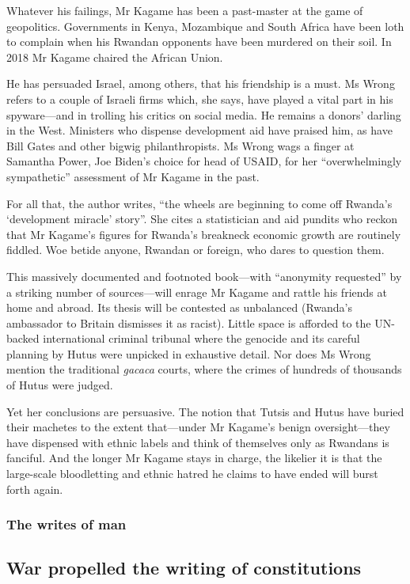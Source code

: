 \documentclass{article}
\begin{document}
Whatever his failings, Mr Kagame has been a past-master at the game of geopolitics. Governments in Kenya, Mozambique and South Africa have been loth to complain when his Rwandan opponents have been murdered on their soil. In 2018 Mr Kagame chaired the African Union. 

He has persuaded Israel, among others, that his friendship is a must. Ms Wrong refers to a couple of Israeli firms which, she says, have played a vital part in his spyware---and in trolling his critics on social media. He remains a donors' darling in the West. Ministers who dispense development aid have praised him, as have Bill Gates and other bigwig philanthropists. Ms Wrong wags a finger at Samantha Power, Joe Biden's choice for head of USAID, for her ``overwhelmingly sympathetic'' assessment of Mr Kagame in the past. 

For all that, the author writes, ``the wheels are beginning to come off Rwanda's `development miracle' story''. She cites a statistician and aid pundits who reckon that Mr Kagame's figures for Rwanda's breakneck economic growth are routinely fiddled. Woe betide anyone, Rwandan or foreign, who dares to question them. 

This massively documented and footnoted book---with ``anonymity requested'' by a striking number of sources---will enrage Mr Kagame and rattle his friends at home and abroad. Its thesis will be contested as unbalanced (Rwanda's ambassador to Britain dismisses it as racist). Little space is afforded to the UN-backed international criminal tribunal where the genocide and its careful planning by Hutus were unpicked in exhaustive detail. Nor does Ms Wrong mention the traditional \emph{gacaca} courts, where the crimes of hundreds of thousands of Hutus were judged. 

Yet her conclusions are persuasive. The notion that Tutsis and Hutus have buried their machetes to the extent that---under Mr Kagame's benign oversight---they have dispensed with ethnic labels and think of themselves only as Rwandans is fanciful. And the longer Mr Kagame stays in charge, the likelier it is that the large-scale bloodletting and ethnic hatred he claims to have ended will burst forth again. {} 
\clearpage
\subsubsection{The writes of man }
\subsection{War propelled the writing of constitutions }
\end{document}
